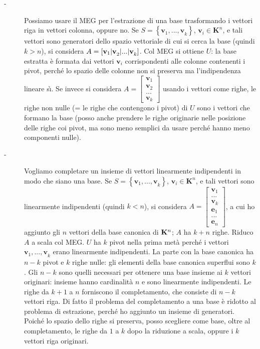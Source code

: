 \documentclass{article}
\begin{document}
\begin{description}
\item[-] Possiamo usare il MEG per l'estrazione di una base trasformando i
vettori riga in vettori colonna, oppure no. Se $S=\left\{ \mathbf{v}_{1}%
\mathbf{,...,v}_{k}\right\} $, $\mathbf{v}_{i}\in \mathbf{K}^{n}$, e tali
vettori sono generatori dello spazio vettoriale di cui si cerca la base
(quindi $k>n$), si considera $A=\left[ \mathbf{v}_{1}\mathbf{|v}_{2}\mathbf{%
|...|v}_{k}\right] $. Col MEG si ottiene $U$: la base estratta \`{e} formata
dai vettori $\mathbf{v}_{i}$ corrispondenti alle colonne contenenti i pivot,
perch\'{e} lo spazio delle colonne non si preserva ma l'indipendenza lineare
s\`{\i}. Se invece si
considera $A=\left[ 
\begin{array}{c}
\mathbf{v}_{1} \\ 
\mathbf{v}_{2} \\ 
... \\ 
\mathbf{v}_{k}%
\end{array}%
\right] $ usando i vettori come righe, le righe non nulle (= le righe che
contengono i pivot) di $U$ sono i vettori che formano la base (posso anche
prendere le righe originarie nelle posizione delle righe coi pivot, ma sono
meno semplici da usare perch\'{e} hanno meno componenti nulle).

\item[-] Vogliamo completare un insieme di vettori linearmente indipendenti
in modo che siano una base. Se $S=\left\{ \mathbf{v}_{1}\mathbf{,...,v}%
_{k}\right\} $, $\mathbf{v}_{i}\in \mathbf{K}^{n}$, e tali vettori sono
linearmente indipendenti (quindi $k<n$), si considera $A=\left[ 
\begin{array}{c}
\mathbf{v}_{1} \\ 
... \\ 
\mathbf{v}_{k} \\ 
\mathbf{e}_{1} \\ 
... \\ 
\mathbf{e}_{n}%
\end{array}%
\right] $, a cui ho aggiunto gli $n$ vettori della base canonica di $\mathbf{%
K}^{n}$; $A$ ha $k+n$ righe. Riduco $A$ a scala col MEG. $U$ ha $k$ pivot
nella prima met\`{a} perch\'{e} i vettori $\mathbf{v}_{1}\mathbf{,...,v}_{k}$
erano linearmente indipendenti. La parte con la base canonica ha $n-k$ pivot
e $k$ righe nulle: gli elementi della base canonica superflui sono $k$. Gli $%
n-k$ sono quelli necessari per ottenere una base insieme ai $k$ vettori
originari: insieme hanno cardinalit\`{a} $n$ e sono linearmente
indipendenti. Le righe da $k+1$ a $n$ forniscono il completamento, che
consiste di $n-k$ vettori riga. Di fatto il problema del completamento a una
base \`{e} ridotto al problema di estrazione, perch\'{e} ho aggiunto un
insieme di generatori. Poich\'{e} lo spazio dello righe si preserva, posso
scegliere come base, oltre al completamento, le righe da $1$ a $k$ dopo la
riduzione a scala, oppure i $k$ vettori riga originari.


\end{description}
\end{document}
